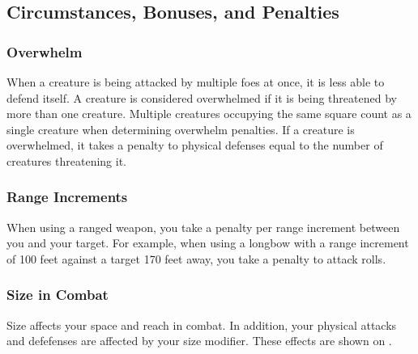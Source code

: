 \subsection{Circumstances, Bonuses, and Penalties}

\subsubsection{Overwhelm}\label{Overwhelm}
When a creature is being attacked by multiple foes at once, it is less able to defend itself.
A creature is considered overwhelmed if it is being threatened by more than one creature.
Multiple creatures occupying the same square count as a single creature when determining overwhelm penalties.
If a creature is overwhelmed, it takes a penalty to physical defenses equal to the number of creatures threatening it.

\subsubsection{Range Increments}
When using a ranged weapon, you take a  penalty per range increment between you and your target.
For example, when using a longbow with a range increment of 100 feet against a target 170 feet away, you take a  penalty to attack rolls.

\subsubsection{Size in Combat}\label{Size in Combat}
Size affects your space and reach in combat.
In addition, your physical attacks and defefenses are affected by your size modifier.
These effects are shown on .

